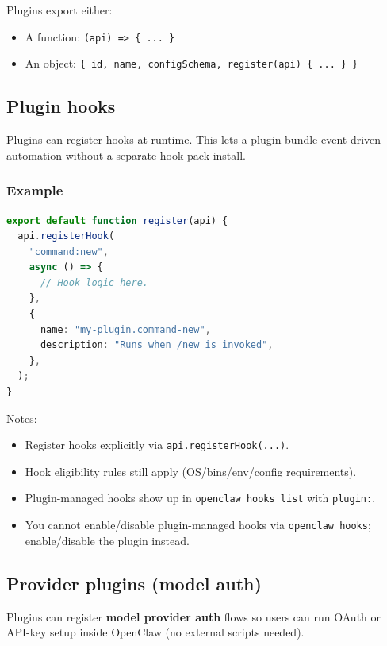 Plugins export either:

\begin{itemize}
  \item A function: \texttt{(api) => \{ ... \}}
  \item An object: \texttt{\{ id, name, configSchema, register(api) \{ ... \} \}}
\end{itemize}


\subsection{Plugin hooks}


Plugins can register hooks at runtime. This lets a plugin bundle event-driven
automation without a separate hook pack install.

\subsubsection{Example}


\begin{lstlisting}[language=typescript]
export default function register(api) {
  api.registerHook(
    "command:new",
    async () => {
      // Hook logic here.
    },
    {
      name: "my-plugin.command-new",
      description: "Runs when /new is invoked",
    },
  );
}
\end{lstlisting}


Notes:

\begin{itemize}
  \item Register hooks explicitly via \texttt{api.registerHook(...)}.
  \item Hook eligibility rules still apply (OS/bins/env/config requirements).
  \item Plugin-managed hooks show up in \texttt{openclaw hooks list} with \texttt{plugin:}.
  \item You cannot enable/disable plugin-managed hooks via \texttt{openclaw hooks}; enable/disable the plugin instead.
\end{itemize}


\subsection{Provider plugins (model auth)}


Plugins can register \textbf{model provider auth} flows so users can run OAuth or
API-key setup inside OpenClaw (no external scripts needed).

